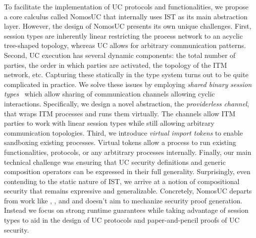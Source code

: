To facilitate the implementation of UC protocols and functionalities, we propose a core calculus called NomosUC that
internally uses IST as its main abstraction layer.
However, the design of NomosUC presents its own unique challenges.
First, session types are inherently linear restricting the process network to an acyclic tree-shaped topology,
whereas UC allows for arbitrary communication patterns.
Second, UC execution has several dynamic components: the total number of parties, the order in which parties are activated,
the topology of the ITM network, etc.
Capturing these statically in the type system turns out to be quite complicated in practice.
We solve these issues by employing \emph{shared binary session types}~\cite{balzer2017manifest} which allow sharing
of communication channels allowing cyclic interactions.
Specifically, we design a novel abstraction, the \emph{providerless channel}, that wraps ITM processes and runs them virtually.
The channels allow ITM parties to work with linear session types while still allowing arbitrary communication topologies.
Third, we introduce \emph{virtual import tokens} to enable sandboxing existing processes.
Virtual tokens allow a process to run existing functionalities, protocols, or any arbtitrary processes internally.
Finally, our main technical challenge was ensuring that UC security definitions and generic composition operators
can be expressed in their full generality.
Surprisingly, even contending to the static nature of IST, we arrive at a notion of compositional security that remains expressive and generalizable.
Concretely, NomosUC departs from work like \cite{easyuc}, \cite{barbosa}, and \cite{ipdl} and doesn't aim to mechanize security proof generation.
Instead we focus on strong runtime guarantees while taking advantage of session types to aid in the design of UC protocols and paper-and-pencil proofs of UC security.

